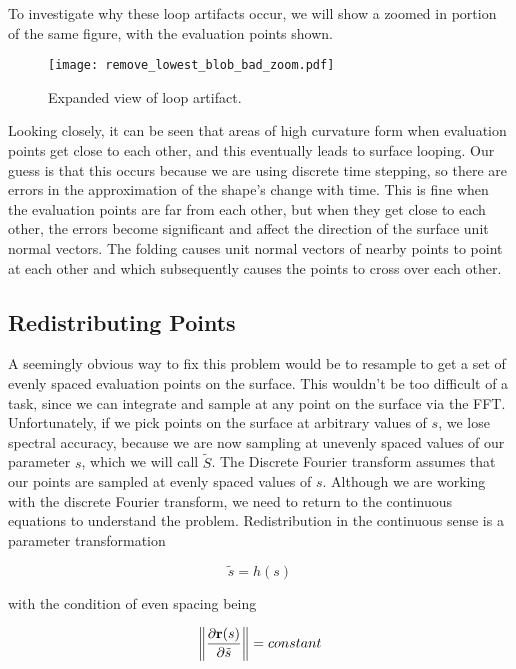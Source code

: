 To investigate why these loop artifacts occur, we will show a zoomed in portion of the same figure, with the evaluation points shown. 

\begin{figure}[H]
    \begin{center}
      \texttt{[image: remove\_lowest\_blob\_bad\_zoom.pdf]}
    \end{center}
  \vspace{-.2in} %
  \caption{Expanded view of loop artifact.\label{fig:remove-lowest-blog-bad-zoom}}
\end{figure}

Looking closely, it can be seen that areas of high curvature form when evaluation points get close to each other, and this eventually leads to surface looping. Our guess is that this occurs because we are using discrete time stepping, so there are errors in the approximation of the shape's change with time. This is fine when the evaluation points are far from each other, but when they get close to each other, the errors become significant and affect the direction of the surface unit normal vectors. The folding causes unit normal vectors of nearby points to point at each other and which subsequently causes the points to cross over each other.

\subsection*{Redistributing Points}

A seemingly obvious way to fix this problem would be to resample to get a set of evenly spaced evaluation points on the surface. This wouldn't be too difficult of a task, since we can integrate and sample at any point on the surface via the FFT. Unfortunately, if we pick points on the surface at arbitrary values of $s$, we lose spectral accuracy, because we are now sampling at unevenly spaced values of our parameter $s$, which we will call $\tilde{S}$. The Discrete Fourier transform assumes that our points are sampled at evenly spaced values of $s$. Although we are working with the discrete Fourier transform, we need to return to the continuous equations to understand the problem. Redistribution in the continuous sense is a parameter transformation

\[ 
  \tilde{s} = h(s)
\]

with the condition of even spacing being

\[
  \norm{\frac{\partial \bvec{r}(s)}{\partial \tilde{s}}} = constant
\]

